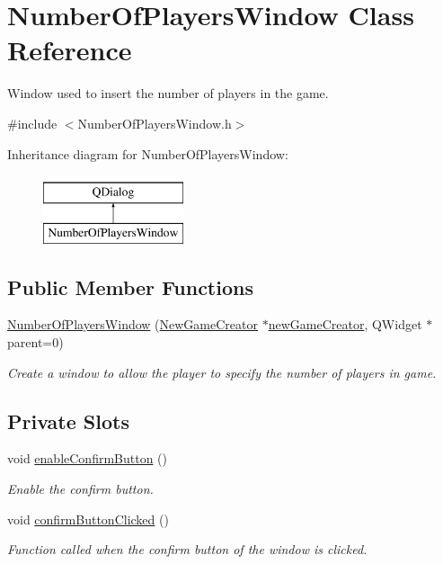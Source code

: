 \hypertarget{classNumberOfPlayersWindow}{}\section{Number\+Of\+Players\+Window Class Reference}
\label{classNumberOfPlayersWindow}


Window used to insert the number of players in the game.  




{\ttfamily \#include $<$Number\+Of\+Players\+Window.\+h$>$}

Inheritance diagram for Number\+Of\+Players\+Window\+:\begin{figure}[H]
\begin{center}
\leavevmode
\includegraphics[height=2.000000cm]{classNumberOfPlayersWindow}
\end{center}
\end{figure}
\subsection*{Public Member Functions}
\begin{DoxyCompactItemize}
\item 
\hyperlink{classNumberOfPlayersWindow_a522ce7de553a78ef1514cc988abb8d38}{Number\+Of\+Players\+Window} (\hyperlink{classNewGameCreator}{New\+Game\+Creator} $\ast$\hyperlink{classNumberOfPlayersWindow_a7a4c90e2553e4f401fde3ec81e7e3f56}{new\+Game\+Creator}, Q\+Widget $\ast$parent=0)
\begin{DoxyCompactList}\small\item\em Create a window to allow the player to specify the number of players in game. \end{DoxyCompactList}\end{DoxyCompactItemize}
\subsection*{Private Slots}
\begin{DoxyCompactItemize}
\item 
void \hyperlink{classNumberOfPlayersWindow_a7fe10b716af29b5cca42267a391587ec}{enable\+Confirm\+Button} ()
\begin{DoxyCompactList}\small\item\em Enable the confirm button. \end{DoxyCompactList}\item 
void \hyperlink{classNumberOfPlayersWindow_aaebac1245ca92099446f0cac82304dab}{confirm\+Button\+Clicked} ()
\begin{DoxyCompactList}\small\item\em Function called when the confirm button of the window is clicked. \end{DoxyCompactList}\end{DoxyCompactItemize}
